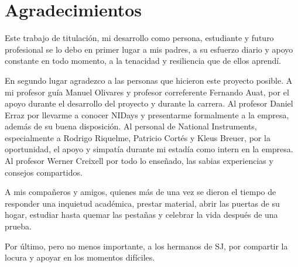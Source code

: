 \documentclass[\main/main.tex]{subfiles}
\begin{document}
\chapter{Agradecimientos}
	Este trabajo de titulación,  mi desarrollo como persona, estudiante y futuro profesional se lo debo en primer lugar a mis padres, a su esfuerzo diario y apoyo constante en todo momento, a la tenacidad y resiliencia que de ellos aprendí.  
\hfill \break

En segundo lugar agradezco a las personas que hicieron este proyecto posible. A mi profesor guía Manuel Olivares y profesor correferente Fernando Auat, por el apoyo durante el desarrollo del proyecto y durante la carrera. 
Al profesor Daniel Erraz por llevarme a conocer NIDays y presentarme formalmente a la empresa, además de su buena disposición. Al personal de National Instruments, especialmente a Rodrigo Riquelme, Patricio Cortés y Kleus Breuer, por la oportunidad, el apoyo y simpatía durante mi estadía como intern en la empresa. Al profesor Werner Creixell por todo lo enseñado, las sabias experiencias y consejos compartidos.
\hfill \break

A mis compañeros y amigos, quienes más de una vez se dieron el tiempo de responder una inquietud académica, prestar material, abrir las puertas de su hogar, estudiar hasta quemar las pestañas y celebrar la vida después de una prueba. 
\hfill \break

Por último, pero no menos importante, a los hermanos de SJ, por compartir la locura y apoyar en los momentos difíciles. 
\end{document}
